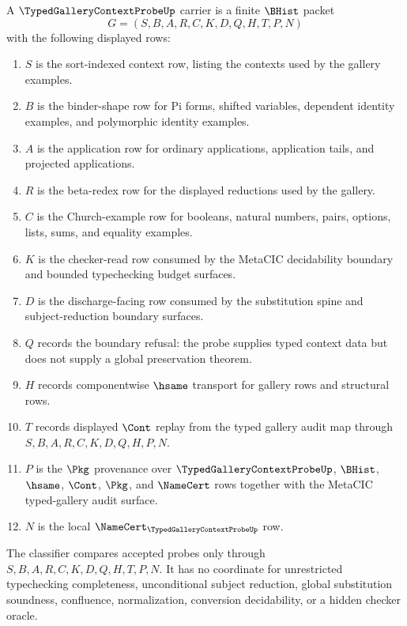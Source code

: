 \begin{definition}
\label{def:typed-gallery-context-probe-carrier}
A $\TypedGalleryContextProbeUp$ carrier is a finite $\BHist$ packet
$$
G=(S,B,A,R,C,K,D,Q,H,T,P,N)
$$
with the following displayed rows:
\begin{enumerate}
\item $S$ is the sort-indexed context row, listing the contexts used by the gallery examples.
\item $B$ is the binder-shape row for Pi forms, shifted variables, dependent identity examples, and polymorphic identity examples.
\item $A$ is the application row for ordinary applications, application tails, and projected applications.
\item $R$ is the beta-redex row for the displayed reductions used by the gallery.
\item $C$ is the Church-example row for booleans, natural numbers, pairs, options, lists, sums, and equality examples.
\item $K$ is the checker-read row consumed by the MetaCIC decidability boundary and bounded typechecking budget surfaces.
\item $D$ is the discharge-facing row consumed by the substitution spine and subject-reduction boundary surfaces.
\item $Q$ records the boundary refusal: the probe supplies typed context data but does not supply a global preservation theorem.
\item $H$ records componentwise $\hsame$ transport for gallery rows and structural rows.
\item $T$ records displayed $\Cont$ replay from the typed gallery audit map through $S,B,A,R,C,K,D,Q,H,P,N$.
\item $P$ is the $\Pkg$ provenance over $\TypedGalleryContextProbeUp$, $\BHist$, $\hsame$, $\Cont$, $\Pkg$, and $\NameCert$ rows together with the MetaCIC typed-gallery audit surface.
\item $N$ is the local $\NameCert_{\TypedGalleryContextProbeUp}$ row.
\end{enumerate}
The classifier compares accepted probes only through $S,B,A,R,C,K,D,Q,H,T,P,N$. It has no coordinate for unrestricted typechecking completeness, unconditional subject reduction, global substitution soundness, confluence, normalization, conversion decidability, or a hidden checker oracle.
\end{definition}

